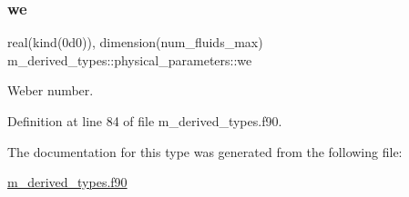 \mbox{\label{structm__derived__types_1_1physical__parameters_ab4e02c9d2708778476fe2e57cd163a17}} 
\subsubsection{\texorpdfstring{we}{we}}
{\footnotesize\ttfamily real(kind(0d0)), dimension(num\+\_\+fluids\+\_\+max) m\+\_\+derived\+\_\+types\+::physical\+\_\+parameters\+::we}



Weber number. 



Definition at line 84 of file m\+\_\+derived\+\_\+types.\+f90.



The documentation for this type was generated from the following file\+:\begin{DoxyCompactItemize}
\item 
\hyperlink{m__derived__types_8f90}{m\+\_\+derived\+\_\+types.\+f90}\end{DoxyCompactItemize}
